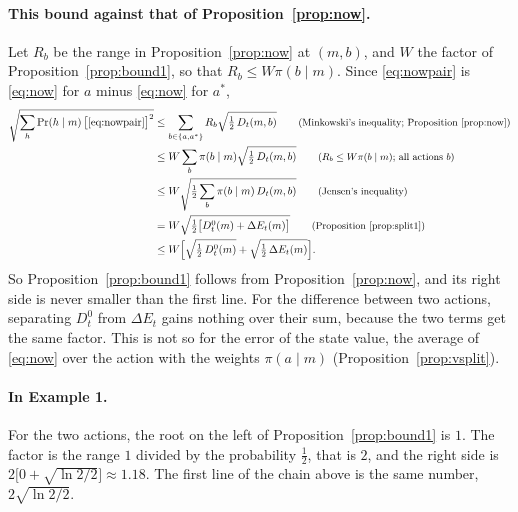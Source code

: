 \documentclass{article}
\theoremstyle{definition}
\newcommand{\dE}{\Delta E}
\newcommand{\why}[1]{\tag*{\small(#1)}}
\begin{document}
\paragraph{This bound against that of Proposition~\ref{prop:now}.} Let $R_b$ be the range in Proposition~\ref{prop:now} at $(m,b)$, and $W$ the factor of Proposition~\ref{prop:bound1}, so that $R_b\le W\pi(b\mid m)$. Since \eqref{eq:nowpair} is \eqref{eq:now} for $a$ minus \eqref{eq:now} for $a^*$,
\begin{align*}
\sqrt{\sum_h\Pr(h\mid m)\,\big[\eqref{eq:nowpair}\big]^2}&\le\sum_{b\in\{a,a^*\}}R_b\sqrt{\tfrac12\,D_t(m,b)} \why{Minkowski's inequality; Proposition~\ref{prop:now}}\\
&\le W\sum_b\pi(b\mid m)\sqrt{\tfrac12\,D_t(m,b)} \why{$R_b\le W\pi(b\mid m)$; all actions $b$}\\
&\le W\sqrt{\tfrac12\sum_b\pi(b\mid m)\,D_t(m,b)} \why{Jensen's inequality}\\
&=W\sqrt{\tfrac12\big[D^0_t(m)+\dE_t(m)\big]} \why{Proposition~\ref{prop:split1}}\\
&\le W\Big[\sqrt{\tfrac12\,D^0_t(m)}+\sqrt{\tfrac12\,\dE_t(m)}\Big].
\end{align*}
So Proposition~\ref{prop:bound1} follows from Proposition~\ref{prop:now}, and its right side is never smaller than the first line. For the difference between two actions, separating $D^0_t$ from $\dE_t$ gains nothing over their sum, because the two terms get the same factor. This is not so for the error of the state value, the average of \eqref{eq:now} over the action with the weights $\pi(a\mid m)$ (Proposition~\ref{prop:vsplit}).

\paragraph{In Example 1.} For the two actions, the root on the left of Proposition~\ref{prop:bound1} is $1$. The factor is the range $1$ divided by the probability $\tfrac12$, that is $2$, and the right side is $2\big[0+\sqrt{\ln2/2}\big]\approx1.18$. The first line of the chain above is the same number, $2\sqrt{\ln2/2}$.
\end{document}
